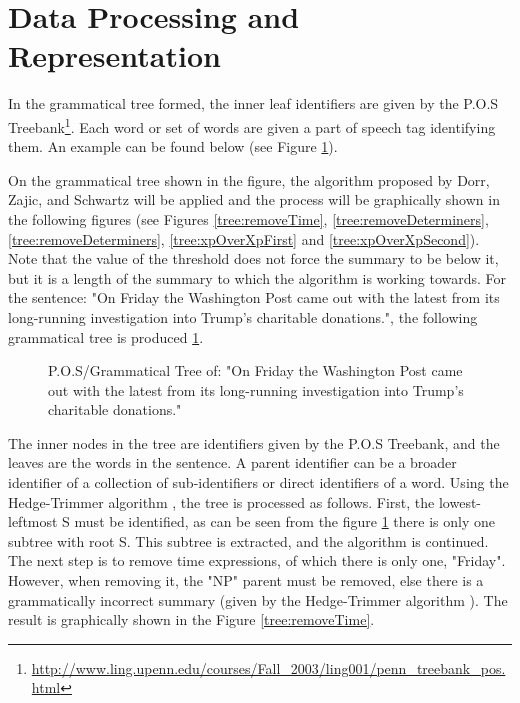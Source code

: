 \section{Data Processing and Representation}
\par In the grammatical tree formed, the inner leaf identifiers are given by the P.O.S Treebank\footnote{\url{http://www.ling.upenn.edu/courses/Fall_2003/ling001/penn_treebank_pos.html}}. Each word or set of words are given a part of speech tag identifying them. An example can be found below (see Figure \ref{tree:origString}).
\par On the grammatical tree shown in the figure, the algorithm proposed by Dorr, Zajic, and Schwartz \cite{dorrzajicschwartz2003} will be applied and the process will be graphically shown in the following figures (see Figures \ref{tree:removeTime}, \ref{tree:removeDeterminers}, \ref{tree:removeDeterminers}, \ref{tree:xpOverXpFirst} and \ref{tree:xpOverXpSecond}). Note that the value of the threshold does not force the summary to be below it, but it is a length of the summary to which the algorithm is working towards. For the sentence: "On Friday the Washington Post came out with the latest from its long-running investigation into Trump's charitable donations.", the following grammatical tree is produced \ref{tree:origString}.
\begin{figure}[h]
\caption{P.O.S/Grammatical Tree of: "On Friday the Washington Post came out with the latest from its long-running investigation into Trump's charitable donations."}
\label{tree:origString}
\end{figure}
\par The inner nodes in the tree are identifiers given by the P.O.S Treebank, and the leaves are the words in the sentence. A parent identifier can be a broader identifier of a collection of sub-identifiers or direct identifiers of a word. Using the Hedge-Trimmer algorithm \cite{dorrzajicschwartz2003}, the tree is processed as follows.  First, the lowest-leftmost S must be identified, as can be seen from the figure \ref{tree:origString} there is only one subtree with root S. This subtree is  extracted, and the algorithm is continued. The next step is to remove time expressions, of which there is only one, "Friday". However, when removing it, the "NP" parent must be removed, else there is a grammatically incorrect summary (given by the Hedge-Trimmer algorithm  \cite{dorrzajicschwartz2003}). The result is graphically shown in the Figure \ref{tree:removeTime}.
